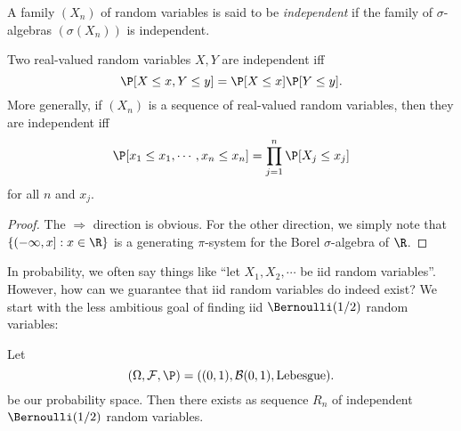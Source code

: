 \documentclass[a4paper]{article}
\begin{document}
\begin{defi}
  A family $(X_n)$ of random variables is said to be \emph{independent} if the family of $\sigma$-algebras $(\sigma(X_n))$ is independent.
\end{defi}

\begin{prop}
  Two real-valued random variables $X, Y$ are independent iff
  \[
    \P[X \leq x, Y \leq y] = \P[X \leq x] \P[Y \leq y].
  \]
  More generally, if $(X_n)$ is a sequence of real-valued random variables, then they are independent iff
  \[
    \P[x_1 \leq x_1, \cdots, x_n \leq x_n] = \prod_{j = 1}^n \P[X_j \leq x_j]
  \]
  for all $n$ and $x_j$.
\end{prop}

\begin{proof}
  The $\Rightarrow$ direction is obvious. For the other direction, we simply note that $\{(-\infty, x]: x \in \R\}$ is a generating $\pi$-system for the Borel $\sigma$-algebra of $\R$.
\end{proof}

In probability, we often say things like ``let $X_1, X_2, \cdots$ be iid random variables''. However, how can we guarantee that iid random variables do indeed exist? We start with the less ambitious goal of finding iid $\Bernoulli(1/2)$ random variables:

\begin{prop}
  Let
  \[
    (\Omega, \mathcal{F}, \P) = ((0, 1), \mathcal{B}(0, 1), \text{Lebesgue}).
  \]
  be our probability space. Then there exists as sequence $R_n$ of independent $\Bernoulli(1/2)$ random variables.
\end{prop}
\end{document}
